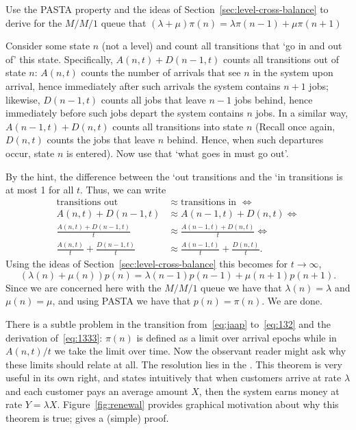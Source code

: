 \begin{exercise}
  Use the PASTA property and the ideas of Section~\ref{sec:level-cross-balance}
 to derive for the $M/M/1$ queue that
$(\lambda + \mu) \pi(n) = \lambda \pi(n-1) + \mu \pi(n+1)$
  \begin{hint}
    Consider some state $n$ (not a level) and count all transitions that `go in and
    out of' this state. Specifically, $A(n,t) + D(n-1,t)$ counts all
    transitions out of state $n$: $A(n,t)$ counts the number of
    arrivals that see $n$ in the system upon arrival, hence
    immediately after such arrivals the system contains $n+1$ jobs;
    likewise, $D(n-1,t)$ counts all jobs that leave $n-1$ jobs behind,
    hence immediately before such jobs depart the system contains $n$
    jobs.  In a similar way, $A(n-1,t) + D(n,t)$ counts all
    transitions into state $n$ (Recall once again, $D(n,t)$ counts the
    jobs that leave $n$ behind. Hence, when such departures occur,
    state $n$ is entered). Now use that `what goes in must go out'.    
  \end{hint}
  \begin{solution}
By  the hint,  the difference between the `out
    transitions and the `in transitions is at most 1 for all $t$. Thus,  we can write
    \begin{align*}
\text{transitions out } &\approx \text{transitions in } \iff \\
      A(n,t) + D(n-1,t) &\approx A(n-1,t) + D(n,t)  \iff \\
      \frac{A(n,t) + D(n-1,t)}t &\approx \frac{A(n-1,t) + D(n, t)}t \iff \\
      \frac{A(n,t)}t + \frac{D(n-1,t)}t &\approx \frac{A(n-1,t)}t + \frac{D(n,t)}t.
    \end{align*}
Using the ideas of Section~\ref{sec:level-cross-balance} this becomes for $t\to\infty$, 
\begin{equation*}
  (\lambda(n) +\mu(n))p(n) = \lambda(n-1)p(n-1) + \mu(n+1)p(n+1).
\end{equation*}
Since we are concerned here with the $M/M/1$ queue we have that
$ \lambda(n) = \lambda$ and $\mu(n) = \mu$, and using PASTA we have
that $p(n) = \pi(n)$. We are done.
  \end{solution}
\end{exercise}



There is a subtle problem in the transition from~\eqref{eq:jaap} to~\eqref{eq:132} and the derivation
of~\eqref{eq:1333}: $\pi(n)$ is defined as a limit over arrival epochs
while in $A(n,t)/t$ we take the limit over time. Now the observant
reader might ask why these limits should relate at all.  The
resolution lies in the . This
theorem is very useful in its own right, and states  intuitively that 
when customers arrive at rate $\lambda$ and each customer pays an average amount $X$, then the system earns money at rate $Y=\lambda X$.  Figure~\ref{fig:renewal} provides graphical motivation about why this theorem is true; \citet{el-taha98:_sampl_path_analy_queuein_system}
gives  a (simple) proof.

